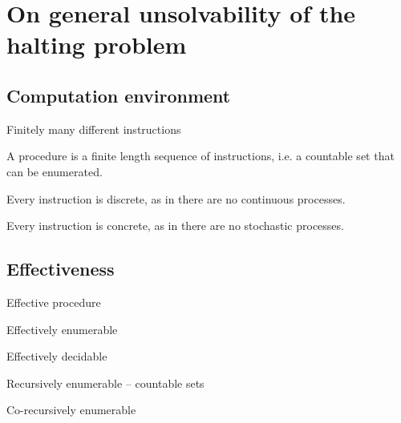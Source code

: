 \chapter{On general unsolvability of the halting problem}

\section{Computation environment}

Finitely many different instructions

A procedure is a finite length sequence of instructions, i.e. a countable set
that can be enumerated.

Every instruction is discrete, as in there are no continuous processes.

Every instruction is concrete, as in there are no stochastic processes.

\section{Effectiveness}

Effective procedure

Effectively enumerable

Effectively decidable

Recursively enumerable -- countable sets

Co-recursively enumerable
